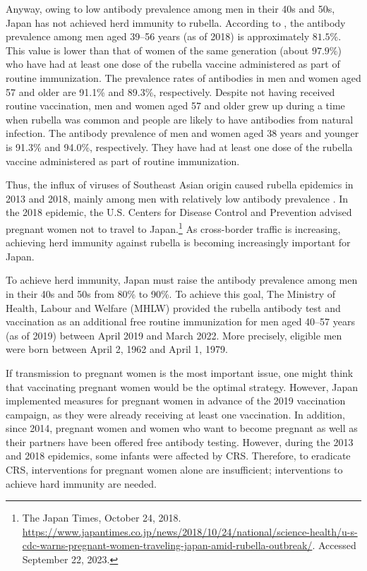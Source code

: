 \documentclass[
    a4paper
]{article}
\begin{document}
Anyway, owing to low antibody prevalence among men in their 40s and 50s, Japan has not achieved herd immunity to rubella. According to \citet{NIIDdata2019}, the antibody prevalence among men aged 39--56 years (as of 2018) is approximately \(81.5\)\%. This value is lower than that of women of the same generation (about \(97.9\)\%) who have had at least one dose of the rubella vaccine administered as part of routine immunization. The prevalence rates of antibodies in men and women aged 57 and older are 91.1\% and 89.3\%, respectively. Despite not having received routine vaccination, men and women aged 57 and older grew up during a time when rubella was common and people are likely to have antibodies from natural infection. The antibody prevalence of men and women aged 38 years and younger is 91.3\% and 94.0\%, respectively. They have had at least one dose of the rubella vaccine administered as part of routine immunization.

Thus, the influx of viruses of Southeast Asian origin caused rubella epidemics in 2013 and 2018, mainly among men with relatively low antibody prevalence \citep{NIID2019}. In the 2018 epidemic, the U.S. Centers for Disease Control and Prevention advised pregnant women not to travel to Japan.\footnote{The Japan Times, October 24, 2018. \url{https://www.japantimes.co.jp/news/2018/10/24/national/science-health/u-s-cdc-warns-pregnant-women-traveling-japan-amid-rubella-outbreak/}. Accessed September 22, 2023.} As cross-border traffic is increasing, achieving herd immunity against rubella is becoming increasingly important for Japan.

To achieve herd immunity, Japan must raise the antibody prevalence among men in their 40s and 50s from 80\% to 90\%. To achieve this goal, The Ministry of Health, Labour and Welfare (MHLW) provided the rubella antibody test and vaccination as an additional free routine immunization for men aged 40--57 years (as of 2019) between April 2019 and March 2022. More precisely, eligible men were born between April 2, 1962 and April 1, 1979.

If transmission to pregnant women is the most important issue, one might think that vaccinating pregnant women would be the optimal strategy. However, Japan implemented measures for pregnant women in advance of the 2019 vaccination campaign, as they were already receiving at least one vaccination. In addition, since 2014, pregnant women and women who want to become pregnant as well as their partners have been offered free antibody testing. However, during the 2013 and 2018 epidemics, some infants were affected by CRS. Therefore, to eradicate CRS, interventions for pregnant women alone are insufficient; interventions to achieve hard immunity are needed.
\end{document}
